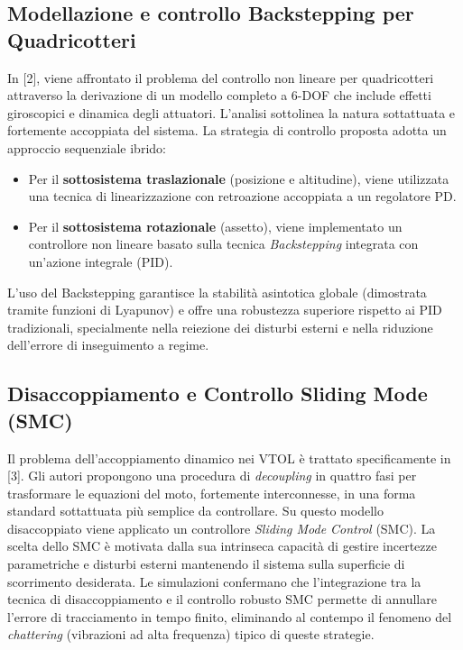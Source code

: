 \documentclass[a4paper,12pt]{article}
\begin{document}
\subsection{Modellazione e controllo Backstepping per Quadricotteri}
In [2], viene affrontato il problema del controllo non lineare per quadricotteri attraverso la derivazione di un modello completo a 6-DOF che include effetti giroscopici e dinamica degli attuatori. L'analisi sottolinea la natura sottattuata e fortemente accoppiata del sistema.
La strategia di controllo proposta adotta un approccio sequenziale ibrido:
\begin{itemize}
    \item Per il \textbf{sottosistema traslazionale} (posizione e altitudine), viene utilizzata una tecnica di linearizzazione con retroazione accoppiata a un regolatore PD.
    \item Per il \textbf{sottosistema rotazionale} (assetto), viene implementato un controllore non lineare basato sulla tecnica \textit{Backstepping} integrata con un'azione integrale (PID).
\end{itemize}
L'uso del Backstepping garantisce la stabilità asintotica globale (dimostrata tramite funzioni di Lyapunov) e offre una robustezza superiore rispetto ai PID tradizionali, specialmente nella reiezione dei disturbi esterni e nella riduzione dell'errore di inseguimento a regime.

\subsection{Disaccoppiamento e Controllo Sliding Mode (SMC)}
Il problema dell'accoppiamento dinamico nei VTOL è trattato specificamente in [3]. Gli autori propongono una procedura di \textit{decoupling} in quattro fasi per trasformare le equazioni del moto, fortemente interconnesse, in una forma standard sottattuata più semplice da controllare.
Su questo modello disaccoppiato viene applicato un controllore \textit{Sliding Mode Control} (SMC). La scelta dello SMC è motivata dalla sua intrinseca capacità di gestire incertezze parametriche e disturbi esterni mantenendo il sistema sulla superficie di scorrimento desiderata. Le simulazioni confermano che l'integrazione tra la tecnica di disaccoppiamento e il controllo robusto SMC permette di annullare l'errore di tracciamento in tempo finito, eliminando al contempo il fenomeno del \textit{chattering} (vibrazioni ad alta frequenza) tipico di queste strategie.
\end{document}
